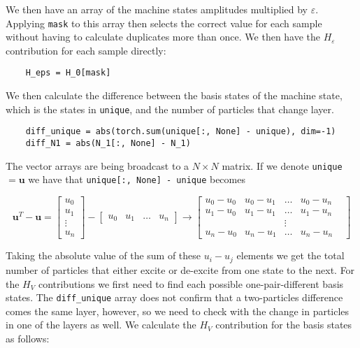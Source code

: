 We then have an array of the machine states amplitudes multiplied by $\varepsilon$. Applying \texttt{mask} to this array then selects the correct value for each sample without having to calculate duplicates more than once. We then have the $H_{\varepsilon}$ contribution for each sample directly:

\begin{verbatim} 
    H_eps = H_0[mask]
\end{verbatim}

We then calculate the difference between the basis states of the machine state, which is the states in \texttt{unique}, and the number of particles that change layer.

\begin{verbatim}
    diff_unique = abs(torch.sum(unique[:, None] - unique), dim=-1)
    diff_N1 = abs(N_1[:, None] - N_1)
\end{verbatim}

The vector arrays are being broadcast to a $N\times N$ matrix. If we denote \texttt{unique} $ = \boldsymbol{u}$ we have that \texttt{unique[:, None] - unique} becomes

\begin{equation}
  \boldsymbol{u}^T - \boldsymbol{ u } = \begin{bmatrix}
    u_0 \\ u_1 \\ \vdots \\ u_n
    \end{bmatrix} - \begin{bmatrix} u_0 & u_1 & \dots & u_n \end{bmatrix} \rightarrow \begin{bmatrix}
    u_0-u_0& u_0-u_1& \dots& u_0-u_n \\
    u_1-u_0& u_1-u_1& \dots& u_1-u_n \\
           & & \vdots & & \\
    u_n-u_0&u_n-u_1 & \dots & u_n-u_n

  \end{bmatrix}
  \label{eq:imp_ham_lip_unique}
\end{equation}

Taking the absolute value of the sum of these $u_i - u_j$ elements we get the total number of particles that either excite or de-excite from one state to the next. For the $H_V$ contributions we first need to find each possible one-pair-different basis states. The \texttt{diff_unique} array does not confirm that a two-particles difference comes the same layer, however, so we need to check with the change in particles in one of the layers as well. We calculate the $H_V$ contribution for the basis states as follows:

